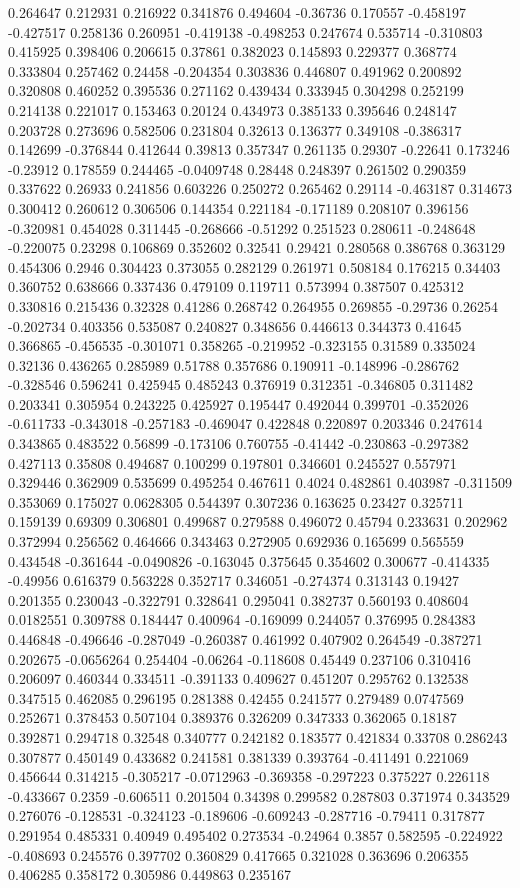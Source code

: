 0.264647 0.212931 0.216922 0.341876 0.494604 -0.36736 0.170557 -0.458197 -0.427517 0.258136 0.260951 -0.419138 -0.498253 0.247674 0.535714 -0.310803 0.415925 0.398406 0.206615 0.37861 0.382023 0.145893 0.229377 0.368774 0.333804 0.257462 0.24458 -0.204354 0.303836 0.446807 0.491962 0.200892 0.320808 0.460252 0.395536 0.271162 0.439434 0.333945 0.304298 0.252199 0.214138 0.221017 0.153463 0.20124 0.434973 0.385133 0.395646 0.248147 0.203728 0.273696 0.582506 0.231804 0.32613 0.136377 0.349108 -0.386317 0.142699 -0.376844 0.412644 0.39813 0.357347 0.261135 0.29307 -0.22641 0.173246 -0.23912 0.178559 0.244465 -0.0409748 0.28448 0.248397 0.261502 0.290359 0.337622 0.26933 0.241856 0.603226 0.250272 0.265462 0.29114 -0.463187 0.314673 0.300412 0.260612 0.306506 0.144354 0.221184 -0.171189 0.208107 0.396156 -0.320981 0.454028 0.311445 -0.268666 -0.51292 0.251523 0.280611 -0.248648 -0.220075 0.23298 0.106869 0.352602 0.32541 0.29421 0.280568 0.386768 0.363129 0.454306 0.2946 0.304423 0.373055 0.282129 0.261971 0.508184 0.176215 0.34403 0.360752 0.638666 0.337436 0.479109 0.119711 0.573994 0.387507 0.425312 0.330816 0.215436 0.32328 0.41286 0.268742 0.264955 0.269855 -0.29736 0.26254 -0.202734 0.403356 0.535087 0.240827 0.348656 0.446613 0.344373 0.41645 0.366865 -0.456535 -0.301071 0.358265 -0.219952 -0.323155 0.31589 0.335024 0.32136 0.436265 0.285989 0.51788 0.357686 0.190911 -0.148996 -0.286762 -0.328546 0.596241 0.425945 0.485243 0.376919 0.312351 -0.346805 0.311482 0.203341 0.305954 0.243225 0.425927 0.195447 0.492044 0.399701 -0.352026 -0.611733 -0.343018 -0.257183 -0.469047 0.422848 0.220897 0.203346 0.247614 0.343865 0.483522 0.56899 -0.173106 0.760755 -0.41442 -0.230863 -0.297382 0.427113 0.35808 0.494687 0.100299 0.197801 0.346601 0.245527 0.557971 0.329446 0.362909 0.535699 0.495254 0.467611 0.4024 0.482861 0.403987 -0.311509 0.353069 0.175027 0.0628305 0.544397 0.307236 0.163625 0.23427 0.325711 0.159139 0.69309 0.306801 0.499687 0.279588 0.496072 0.45794 0.233631 0.202962 0.372994 0.256562 0.464666 0.343463 0.272905 0.692936 0.165699 0.565559 0.434548 -0.361644 -0.0490826 -0.163045 0.375645 0.354602 0.300677 -0.414335 -0.49956 0.616379 0.563228 0.352717 0.346051 -0.274374 0.313143 0.19427 0.201355 0.230043 -0.322791 0.328641 0.295041 0.382737 0.560193 0.408604 0.0182551 0.309788 0.184447 0.400964 -0.169099 0.244057 0.376995 0.284383 0.446848 -0.496646 -0.287049 -0.260387 0.461992 0.407902 0.264549 -0.387271 0.202675 -0.0656264 0.254404 -0.06264 -0.118608 0.45449 0.237106 0.310416 0.206097 0.460344 0.334511 -0.391133 0.409627 0.451207 0.295762 0.132538 0.347515 0.462085 0.296195 0.281388 0.42455 0.241577 0.279489 0.0747569 0.252671 0.378453 0.507104 0.389376 0.326209 0.347333 0.362065 0.18187 0.392871 0.294718 0.32548 0.340777 0.242182 0.183577 0.421834 0.33708 0.286243 0.307877 0.450149 0.433682 0.241581 0.381339 0.393764 -0.411491 0.221069 0.456644 0.314215 -0.305217 -0.0712963 -0.369358 -0.297223 0.375227 0.226118 -0.433667 0.2359 -0.606511 0.201504 0.34398 0.299582 0.287803 0.371974 0.343529 0.276076 -0.128531 -0.324123 -0.189606 -0.609243 -0.287716 -0.79411 0.317877 0.291954 0.485331 0.40949 0.495402 0.273534 -0.24964 0.3857 0.582595 -0.224922 -0.408693 0.245576 0.397702 0.360829 0.417665 0.321028 0.363696 0.206355 0.406285 0.358172 0.305986 0.449863 0.235167 